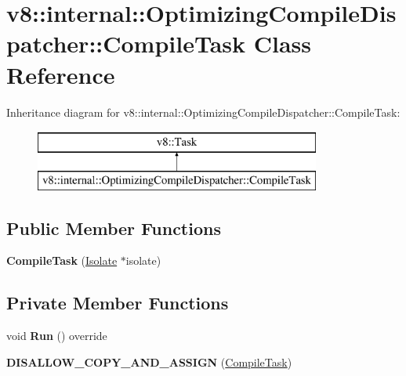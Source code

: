 \hypertarget{classv8_1_1internal_1_1_optimizing_compile_dispatcher_1_1_compile_task}{}\section{v8\+:\+:internal\+:\+:Optimizing\+Compile\+Dispatcher\+:\+:Compile\+Task Class Reference}
\label{classv8_1_1internal_1_1_optimizing_compile_dispatcher_1_1_compile_task}
Inheritance diagram for v8\+:\+:internal\+:\+:Optimizing\+Compile\+Dispatcher\+:\+:Compile\+Task\+:\begin{figure}[H]
\begin{center}
\leavevmode
\includegraphics[height=2.000000cm]{classv8_1_1internal_1_1_optimizing_compile_dispatcher_1_1_compile_task}
\end{center}
\end{figure}
\subsection*{Public Member Functions}
\begin{DoxyCompactItemize}
\item 
{\bfseries Compile\+Task} (\hyperlink{classv8_1_1internal_1_1_isolate}{Isolate} $\ast$isolate)\hypertarget{classv8_1_1internal_1_1_optimizing_compile_dispatcher_1_1_compile_task_a6ac08d5d6f1f92a03676578dc13c27b7}{}\label{classv8_1_1internal_1_1_optimizing_compile_dispatcher_1_1_compile_task_a6ac08d5d6f1f92a03676578dc13c27b7}

\end{DoxyCompactItemize}
\subsection*{Private Member Functions}
\begin{DoxyCompactItemize}
\item 
void {\bfseries Run} () override\hypertarget{classv8_1_1internal_1_1_optimizing_compile_dispatcher_1_1_compile_task_a73097b67ae4c8d181da1bdb87c41de96}{}\label{classv8_1_1internal_1_1_optimizing_compile_dispatcher_1_1_compile_task_a73097b67ae4c8d181da1bdb87c41de96}

\item 
{\bfseries D\+I\+S\+A\+L\+L\+O\+W\+\_\+\+C\+O\+P\+Y\+\_\+\+A\+N\+D\+\_\+\+A\+S\+S\+I\+GN} (\hyperlink{classv8_1_1internal_1_1_optimizing_compile_dispatcher_1_1_compile_task}{Compile\+Task})\hypertarget{classv8_1_1internal_1_1_optimizing_compile_dispatcher_1_1_compile_task_a004b5c11d026c048bd49c183c5b55231}{}\label{classv8_1_1internal_1_1_optimizing_compile_dispatcher_1_1_compile_task_a004b5c11d026c048bd49c183c5b55231}

\end{DoxyCompactItemize}
